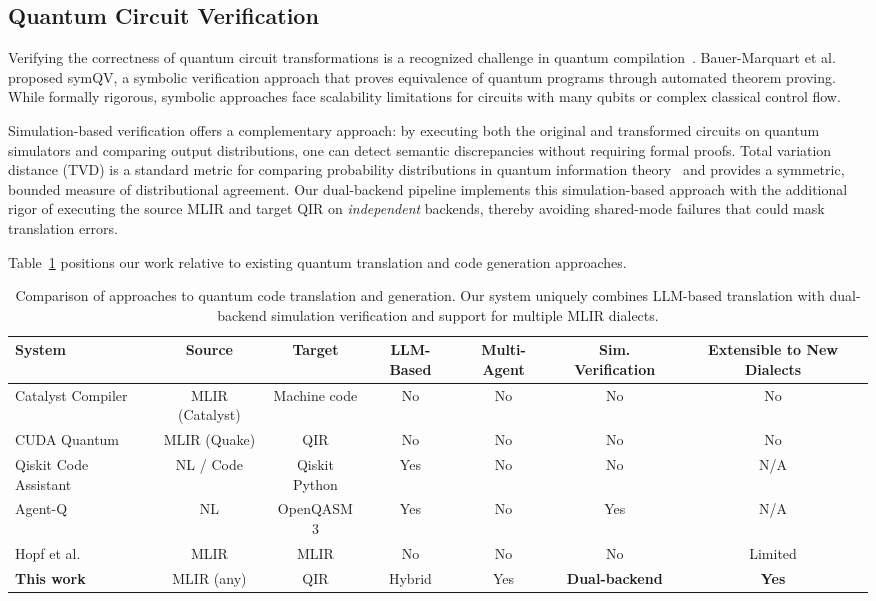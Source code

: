 \documentclass[conference]{IEEEtran}
\begin{document}
\subsection{Quantum Circuit Verification}

Verifying the correctness of quantum circuit transformations is a recognized challenge in quantum compilation~\cite{karuppasamy2025comprehensive}. Bauer-Marquart et al.~\cite{bauer2023symqv} proposed symQV, a symbolic verification approach that proves equivalence of quantum programs through automated theorem proving. While formally rigorous, symbolic approaches face scalability limitations for circuits with many qubits or complex classical control flow.

Simulation-based verification offers a complementary approach: by executing both the original and transformed circuits on quantum simulators and comparing output distributions, one can detect semantic discrepancies without requiring formal proofs. Total variation distance (TVD) is a standard metric for comparing probability distributions in quantum information theory~\cite{nielsen2010quantum} and provides a symmetric, bounded measure of distributional agreement. Our dual-backend pipeline implements this simulation-based approach with the additional rigor of executing the source MLIR and target QIR on \emph{independent} backends, thereby avoiding shared-mode failures that could mask translation errors.

Table~\ref{tab:comparison} positions our work relative to existing quantum translation and code generation approaches.

\begin{table}[t]
\centering
\caption{Comparison of approaches to quantum code translation and generation. Our system uniquely combines LLM-based translation with dual-backend simulation verification and support for multiple MLIR dialects.}
\label{tab:comparison}
\renewcommand{\arraystretch}{1.15}
\begin{tabular}{@{}lcccccc@{}}
\toprule
\textbf{System} & \textbf{Source} & \textbf{Target} & \textbf{LLM-Based} & \textbf{Multi-Agent} & \textbf{Sim. Verification} & \textbf{Extensible to New Dialects} \\
\midrule
Catalyst Compiler~\cite{ittah2024catalyst}        & MLIR (Catalyst) & Machine code & No  & No  & No  & No  \\
CUDA Quantum~\cite{kim2023cudaquantum}             & MLIR (Quake)    & QIR          & No  & No  & No  & No  \\
Qiskit Code Assistant~\cite{dupuis2024qiskitassistant} & NL / Code   & Qiskit Python & Yes & No  & No  & N/A \\
Agent-Q~\cite{jern2025agentq}                      & NL              & OpenQASM 3   & Yes & No  & Yes & N/A \\
Hopf et al.~\cite{hopf2026integrating}             & MLIR            & MLIR         & No  & No  & No  & Limited \\
\textbf{This work}                                  & MLIR (any)      & QIR          & Hybrid & Yes & \textbf{Dual-backend} & \textbf{Yes} \\
\bottomrule
\end{tabular}
\end{table}
\end{document}
